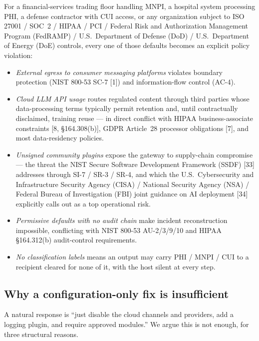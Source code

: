 \documentclass[11pt]{article}
\begin{document}
For a financial-services trading floor handling MNPI, a hospital
system processing PHI, a defense contractor with CUI access, or any
organization subject to ISO 27001 / SOC~2 / HIPAA / PCI / Federal
Risk and Authorization Management Program (FedRAMP) / U.S.\
Department of Defense (DoD) / U.S.\ Department of Energy (DoE)
controls, every one of those defaults becomes an explicit policy
violation:

\begin{itemize}
  \item \emph{External egress to consumer messaging platforms} violates
    boundary protection (NIST 800-53 SC-7 [1]) and information-flow
    control (AC-4).
  \item \emph{Cloud LLM API usage} routes regulated content through
    third parties whose data-processing terms typically permit
    retention and, until contractually disclaimed, training reuse ---
    in direct conflict with HIPAA business-associate constraints [8,
    §164.308(b)], GDPR Article~28 processor obligations [7], and
    most data-residency policies.
  \item \emph{Unsigned community plugins} expose the gateway to
    supply-chain compromise --- the threat the NIST Secure Software
    Development Framework (SSDF) [33] addresses through SI-7 / SR-3 /
    SR-4, and which the U.S.\ Cybersecurity and Infrastructure Security
    Agency (CISA) / National Security Agency (NSA) / Federal Bureau of
    Investigation (FBI) joint guidance on AI deployment [34] explicitly
    calls out as a top operational risk.
  \item \emph{Permissive defaults with no audit chain} make incident
    reconstruction impossible, conflicting with NIST 800-53 AU-2/3/9/10
    and HIPAA §164.312(b) audit-control requirements.
  \item \emph{No classification labels} means an output may carry
    PHI / MNPI / CUI to a recipient cleared for none of it, with the
    host silent at every step.
\end{itemize}

\subsection{Why a configuration-only fix is insufficient}

A natural response is ``just disable the cloud channels and providers,
add a logging plugin, and require approved modules.'' We argue this is
not enough, for three structural reasons.
\end{document}
